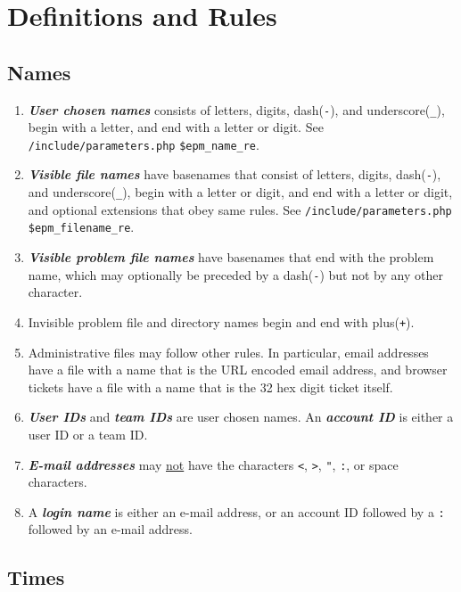 \documentclass[12pt]{article}
\newcommand{\key}[1]{{\bf \em #1}}
\begin{document}
\section{Definitions and Rules}

\subsection{Names}\label{NAMES}

\begin{enumerate}
\item \key{User chosen names}\label{USER-CHOSEN-NAME}
consists of letters, digits,
dash({\tt -}), and underscore({\tt \_}), begin with a letter,
and end with a letter or digit.
See {\tt /include/parameters.php} {\tt \$epm\_name\_re}.
\item \key{Visible file names} have basenames that
consist of letters, digits, dash({\tt -}), and
underscore({\tt \_}), begin with a letter or digit, and end
with a letter or digit, and optional extensions that obey
same rules.  See {\tt /include/parameters.php} {\tt \$epm\_filename\_re}.
\item \key{Visible problem file names} have basenames that end with the
      problem name, which may optionally be preceded by a dash({\tt -}) but
      not by any other character.
\item Invisible problem
      file and directory names begin and end with plus({\tt +}).
\item Administrative files may follow other rules.  In particular,
      email addresses have a file with a name that is the URL encoded email
      address, and browser tickets have a file with a name that is the
      32 hex digit ticket itself.
\item \key{User IDs} and \key{team IDs}\label{AIDS} are user chosen names.
      An \key{account ID} is either a user ID or a team ID.
\item \key{E-mail addresses} may \underline{not} have the
      characters {\tt <}, {\tt >}, {\tt "}, {\tt :}, or space
      characters.
\item A \key{login name} is either an e-mail address, or an
      account ID followed by a {\tt :} followed by an e-mail address.
\end{enumerate}

\subsection{Times}
\end{document}
